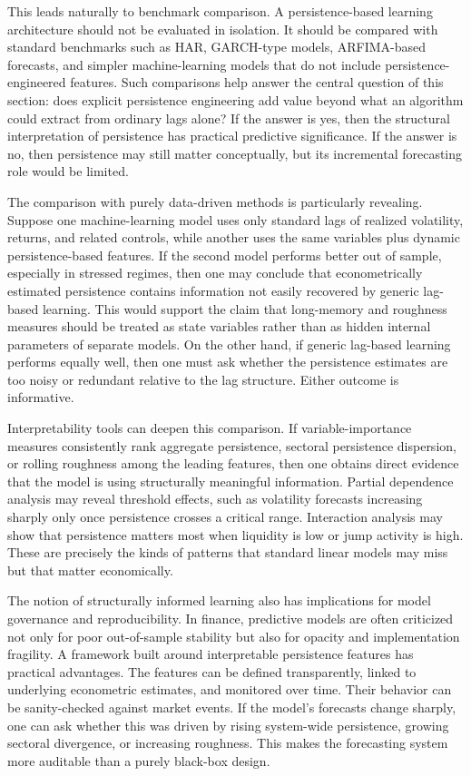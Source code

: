 \documentclass[12pt]{article}
\begin{document}
This leads naturally to benchmark comparison. A persistence-based learning architecture should not be evaluated in isolation. It should be compared with standard benchmarks such as HAR, GARCH-type models, ARFIMA-based forecasts, and simpler machine-learning models that do not include persistence-engineered features. Such comparisons help answer the central question of this section: does explicit persistence engineering add value beyond what an algorithm could extract from ordinary lags alone? If the answer is yes, then the structural interpretation of persistence has practical predictive significance. If the answer is no, then persistence may still matter conceptually, but its incremental forecasting role would be limited.

The comparison with purely data-driven methods is particularly revealing. Suppose one machine-learning model uses only standard lags of realized volatility, returns, and related controls, while another uses the same variables plus dynamic persistence-based features. If the second model performs better out of sample, especially in stressed regimes, then one may conclude that econometrically estimated persistence contains information not easily recovered by generic lag-based learning. This would support the claim that long-memory and roughness measures should be treated as state variables rather than as hidden internal parameters of separate models. On the other hand, if generic lag-based learning performs equally well, then one must ask whether the persistence estimates are too noisy or redundant relative to the lag structure. Either outcome is informative.

Interpretability tools can deepen this comparison. If variable-importance measures consistently rank aggregate persistence, sectoral persistence dispersion, or rolling roughness among the leading features, then one obtains direct evidence that the model is using structurally meaningful information. Partial dependence analysis may reveal threshold effects, such as volatility forecasts increasing sharply only once persistence crosses a critical range. Interaction analysis may show that persistence matters most when liquidity is low or jump activity is high. These are precisely the kinds of patterns that standard linear models may miss but that matter economically.

The notion of structurally informed learning also has implications for model governance and reproducibility. In finance, predictive models are often criticized not only for poor out-of-sample stability but also for opacity and implementation fragility. A framework built around interpretable persistence features has practical advantages. The features can be defined transparently, linked to underlying econometric estimates, and monitored over time. Their behavior can be sanity-checked against market events. If the model's forecasts change sharply, one can ask whether this was driven by rising system-wide persistence, growing sectoral divergence, or increasing roughness. This makes the forecasting system more auditable than a purely black-box design.
\end{document}
